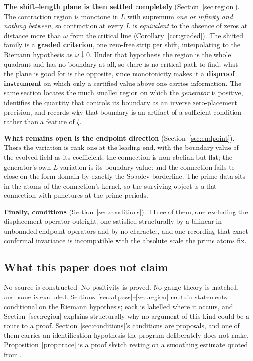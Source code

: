\textbf{The shift--length plane is then settled completely}
(Section~\ref{sec:region}). The contraction region is monotone in $L$ with
supremum \emph{one or infinity and nothing between}, so contraction at every $L$
is \emph{equivalent} to the absence of zeros at distance more than $\omega$ from
the critical line (Corollary~\ref{cor:graded}). The shifted family is a
\textbf{graded criterion}, one zero-free strip per shift, interpolating to the
Riemann hypothesis as $\omega\downarrow0$. Under that hypothesis the region is the
whole quadrant and has no boundary at all, so there is no critical path to find;
what the plane is good for is the opposite, since monotonicity makes it a
\textbf{disproof instrument} on which only a certified value above one carries
information. The same section locates the much smaller region on which the
\emph{generator} is positive, identifies the quantity that controls its boundary
as an inverse zero-placement precision, and records why that boundary is an
artifact of a sufficient condition rather than a feature of $\zeta$.

\textbf{What remains open is the endpoint direction} (Section~\ref{sec:endpoint}).
There the variation is rank one at the leading end, with the boundary value of
the evolved field as its coefficient; the connection is non-abelian but flat; the
generator's own $L$-variation is its boundary value; and the connection fails to
close on the form domain by exactly the Sobolev borderline. The prime data sits
in the atoms of the connection's kernel, so the surviving object is a flat
connection with punctures at the prime periods.

\textbf{Finally, conditions} (Section~\ref{sec:conditions}). Three of them, one
excluding the displacement operator outright, one satisfied structurally by a
bilinear in unbounded endpoint operators and by no character, and one recording
that exact conformal invariance is incompatible with the absolute scale the prime
atoms fix.

\subsection*{What this paper does not claim}

No source is constructed. No positivity is proved. No gauge theory is matched,
and none is excluded. Sections~\ref{sec:allpass}--\ref{sec:region} contain
statements conditional on the Riemann hypothesis; each is labelled where it
occurs, and Section~\ref{sec:region} explains structurally why no argument of this
kind could be a route to a proof. Section~\ref{sec:conditions}'s conditions are
proposals, and one of them carries an identification hypothesis the program
deliberately does not make. Proposition~\ref{prop:trace} is a proof sketch resting
on a smoothing estimate quoted from \cite{Background}.

